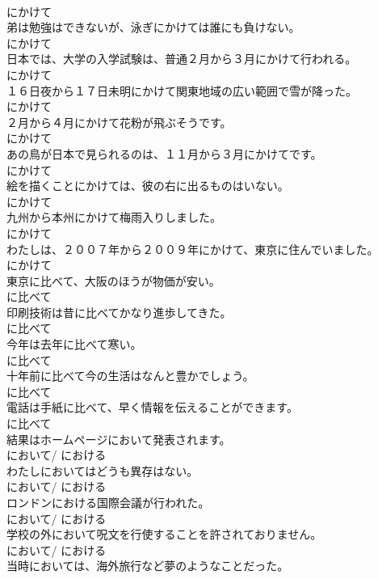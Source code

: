 \documentclass[8pt]{extreport}
\begin{document}
\begin{CJK}{UTF8}{min}
\\	にかけて
\\	弟は勉強はできないが、泳ぎにかけては誰にも負けない。	
\\	にかけて
\\	日本では、大学の入学試験は、普通２月から３月にかけて行われる。	
\\	にかけて
\\	１６日夜から１７日未明にかけて関東地域の広い範囲で雪が降った。	
\\	にかけて
\\	２月から４月にかけて花粉が飛ぶそうです。	
\\	にかけて
\\	あの鳥が日本で見られるのは、１１月から３月にかけてです。	
\\	にかけて
\\	絵を描くことにかけては、彼の右に出るものはいない。	
\\	にかけて
\\	九州から本州にかけて梅雨入りしました。	
\\	にかけて
\\	わたしは、２００７年から２００９年にかけて、東京に住んでいました。	
\\	にかけて
\\	東京に比べて、大阪のほうが物価が安い。	
\\	に比べて
\\	印刷技術は昔に比べてかなり進歩してきた。	
\\	に比べて
\\	今年は去年に比べて寒い。	
\\	に比べて
\\	十年前に比べて今の生活はなんと豊かでしょう。	
\\	に比べて
\\	電話は手紙に比べて、早く情報を伝えることができます。	
\\	に比べて
\\	結果はホームページにおいて発表されます。	
\\	において/ における
\\	わたしにおいてはどうも異存はない。	
\\	において/ における
\\	ロンドンにおける国際会議が行われた。	
\\	において/ における
\\	学校の外において呪文を行使することを許されておりません。	
\\	において/ における
\\	当時においては、海外旅行など夢のようなことだった。	

\end{CJK}
\end{document}
